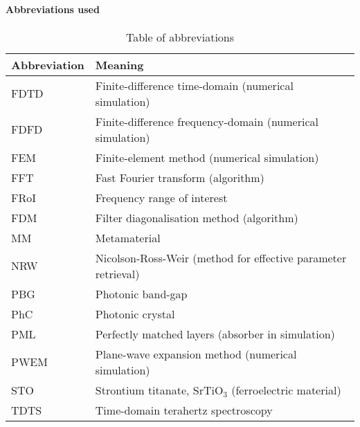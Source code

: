 \paragraph{Abbreviations used} %
\begin{table}[ht]   \caption{Table of abbreviations}  \label{tb_shortcuts} \centering 
\begin{tabular}{ll}
 \toprule
Abbreviation & Meaning	\\
 \hline
FDTD 		& Finite-difference time-domain (numerical simulation)\\
FDFD 		& Finite-difference frequency-domain (numerical simulation)\\
FEM 		& Finite-element method (numerical simulation)\\
FFT 		& Fast Fourier transform (algorithm)\\
FRoI 		& Frequency range of interest\\
FDM 		& Filter diagonalisation method (algorithm)\\
MM			& Metamaterial\\
NRW 		& Nicolson-Ross-Weir (method for effective parameter retrieval)\\
PBG			& Photonic band-gap\\
PhC 		& Photonic crystal\\
PML 		& Perfectly matched layers (absorber in simulation)\\
PWEM 		& Plane-wave expansion method (numerical simulation)\\
STO			& Strontium titanate, SrTiO$_3$ (ferroelectric material)\\
TDTS 		& Time-domain terahertz spectroscopy\\
 \bottomrule
 \end{tabular} \end{table}

